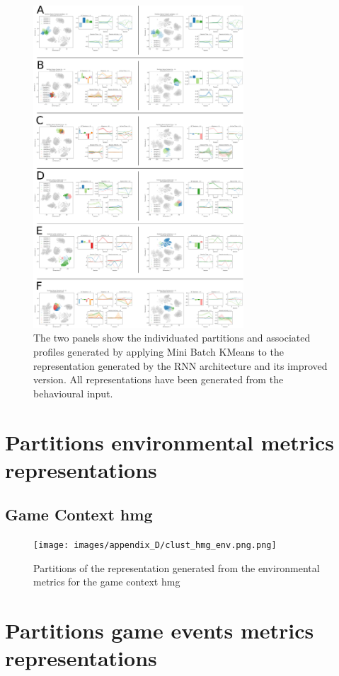 \begin{figure}[ht]
\includegraphics[width=0.7\textwidth]{images/appendix_D/clust_beha_all.png}
\centering
\caption[Partitions of the representations generated by the RNN architecture and its improved version from the behavioural metrics]{The two panels show the individuated partitions and associated profiles generated by applying Mini Batch KMeans to the representation generated by the RNN architecture and its improved version. All representations have been generated from the behavioural input.}
\label{partition_rnn_behaviour} 
\end{figure}
\FloatBarrier

\section{Partitions environmental metrics representations}
\label{partitions_environmental}

\subsection{Game Context hmg}
\label{env_clust_hmg}

\begin{figure}[ht]
\texttt{[image: images/appendix\_D/clust\_hmg\_env.png.png]}
\centering
\caption[Partitions of the representation generated from the environmental metrics for the game context hmg]{Partitions of the representation generated from the environmental metrics for the game context hmg}
\label{clust_hmg_env} 
\end{figure}
\FloatBarrier

\section{Partitions game events metrics representations}
\label{partitions_game_events}